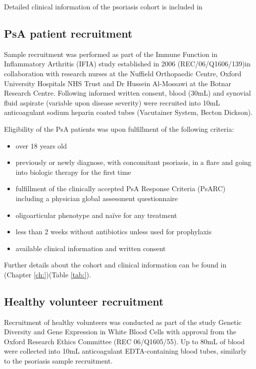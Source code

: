 Detailed clinical information of the psoriasis cohort is included in %

\subsection{PsA patient recruitment}
Sample recruitment was performed as part of the Immune Function in Inflammatory Arthritis (IFIA) study established in 2006 (REC/06/Q1606/139)in collaboration with research nurses at the Nuffield Orthopaedic Centre, Oxford University Hospitals NHS Trust and Dr Hussein Al-Mossawi at the Botnar Research Centre. Following informed written consent, blood (30mL) and synovial fluid aspirate (variable upon disease severity) were recruited into 10mL anticoagulant sodium heparin coated tubes (Vacutainer System, Becton Dickson).

Eligibility of the PsA patients was upon fulfillment of the following criteria:
\begin{itemize}
  \item over 18 years old
  \item previously or newly diagnose, with concomitant psoriasis, in a flare and going into biologic therapy for the first time %
	\item fulfillment of the clinically accepted PsA Response Criteria (PsARC) including a physician global assessment questionnaire \parencite{Philipp2011,Clegg1996}
	\item oligoarticular phenotype and na\"{i}ve for any treatment
	\item less than 2 weeks without antibiotics unless used for prophylaxis %
	\item available clinical information and written consent
\end{itemize}

Further details about the cohort and clinical information can be found in (Chapter \ref{ch:})(Table \ref{tab:}).

\subsection{Healthy volunteer recruitment}
Recruitment of healthy volunteers was conducted as part of the study Genetic Diversity and Gene Expression in White Blood Cells with approval from the Oxford Research Ethics Committee (REC 06/Q1605/55). Up to 80mL of blood were collected into 10mL anticoagulant EDTA-containing blood tubes, similarly to the psoriasis sample recruitment.

